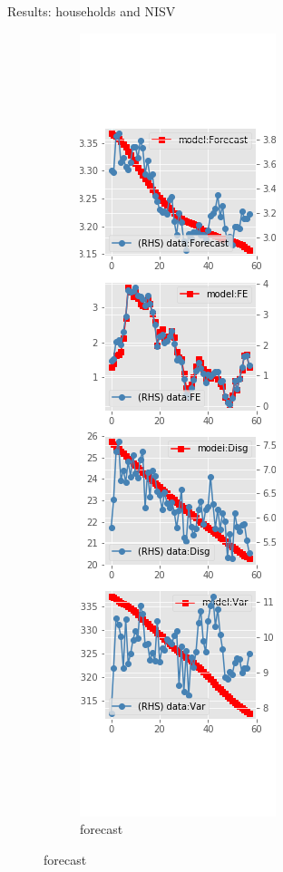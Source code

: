 \documentclass{beamer}
\begin{document}
\begin{frame}{Results: households and NISV}
	\begin{figure}[ht]
		\label{NISV_diag_SCE}
		\begin{subfigure}[b]{0.19\textwidth}
			\centering
			\caption{forecast}
			\includegraphics[width=\textwidth, height = 0.8\textheight]{figuresDraft/sce_ni_est_sv_diag0.png}

\end{subfigure}
\end{figure}
\end{frame}
\end{document}
